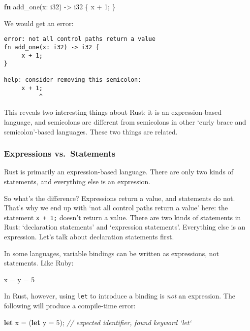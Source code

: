 \documentclass[a4paper,]{book}
\newenvironment{Shaded}{\begin{snugshade}}{\end{snugshade}}
\newcommand{\KeywordTok}[1]{\textcolor[rgb]{0.13,0.29,0.53}{\textbf{{#1}}}}
\newcommand{\DataTypeTok}[1]{\textcolor[rgb]{0.13,0.29,0.53}{{#1}}}
\newcommand{\DecValTok}[1]{\textcolor[rgb]{0.00,0.00,0.81}{{#1}}}
\newcommand{\CommentTok}[1]{\textcolor[rgb]{0.56,0.35,0.01}{\textit{{#1}}}}
\newcommand{\NormalTok}[1]{{#1}}
\begin{document}
\begin{Shaded}
\begin{Highlighting}[]
\KeywordTok{fn} \NormalTok{add_one(x: }\DataTypeTok{i32}\NormalTok{) -> }\DataTypeTok{i32} \NormalTok{\{}
    \NormalTok{x + }\DecValTok{1}\NormalTok{;}
\NormalTok{\}}
\end{Highlighting}
\end{Shaded}

We would get an error:

\begin{verbatim}
error: not all control paths return a value
fn add_one(x: i32) -> i32 {
     x + 1;
}

help: consider removing this semicolon:
     x + 1;
          ^
\end{verbatim}

This reveals two interesting things about Rust: it is an
expression-based language, and semicolons are different from semicolons
in other `curly brace and semicolon'-based languages. These two things
are related.

\subsubsection{Expressions
vs.~Statements}\label{expressions-vs.statements}

Rust is primarily an expression-based language. There are only two kinds
of statements, and everything else is an expression.

So what's the difference? Expressions return a value, and statements do
not. That's why we end up with `not all control paths return a value'
here: the statement \texttt{x\ +\ 1;} doesn't return a value. There are
two kinds of statements in Rust: `declaration statements' and
`expression statements'. Everything else is an expression. Let's talk
about declaration statements first.

In some languages, variable bindings can be written as expressions, not
statements. Like Ruby:

\begin{Shaded}
\begin{Highlighting}[]
\NormalTok{x = y = }\DecValTok{5}
\end{Highlighting}
\end{Shaded}

In Rust, however, using \texttt{let} to introduce a binding is
\emph{not} an expression. The following will produce a compile-time
error:

\begin{Shaded}
\begin{Highlighting}[]
\KeywordTok{let} \NormalTok{x = (}\KeywordTok{let} \NormalTok{y = }\DecValTok{5}\NormalTok{); }\CommentTok{// expected identifier, found keyword `let`}
\end{Highlighting}
\end{Shaded}
\end{document}
